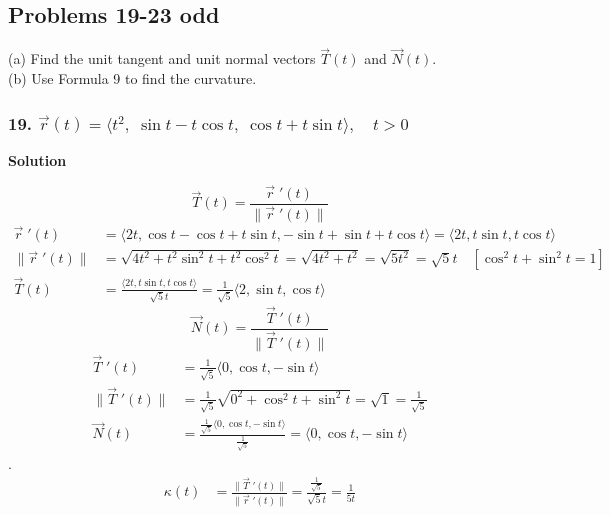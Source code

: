 \documentclass{article}
\newcommand{\drvec}{\vec{r}\;'(t)}
\begin{document}
\subsection*{Problems 19-23 odd}

(a) Find the unit tangent and unit normal vectors $\vec{T}(t)$ and $\vec{N}(t)$. \\
(b) Use Formula 9 to find the curvature.

\subsubsection*{19. $\vec{r}(t) = \langle{t^2,\; \sin{t} - t\cos{t},\; \cos{t} + t\sin{t}} \rangle, \quad t > 0$}
\centerline{\textbf{Solution}}
\[
    \vec{T}(t) = \frac{\drvec}{\|\drvec\|}   
\]
\begin{align*}
    \drvec &= \langle 2t, \cos t - \cos t + t\sin t, -\sin t + \sin t + t\cos t \rangle = \langle 2t, t\sin t, t\cos t \rangle \\
    \|\drvec\| &= \sqrt{4t^2 + t^2\sin^2t + t^2\cos^2t} = \sqrt{4t^2 + t^2} = \sqrt{5t^2} = \sqrt{5}t \quad [\cos^2t + \sin^2t = 1] \\ 
    \vec{T}(t) &= \frac{\langle 2t, t\sin t, t\cos t \rangle}{\sqrt{5}t} = \frac{1}{\sqrt{5}}\langle 2, \sin t, \cos t \rangle
\end{align*}
\[
    \vec{N}(t) = \frac{\vec{T}\;'(t)}{\|\vec{T}\;'(t)\|}
\]
\begin{align*}
    \vec{T}\;'(t) &= \frac{1}{\sqrt{5}}\langle 0, \cos t, -\sin t \rangle \\
    \|\vec{T}\;'(t)\| &= \frac {1}{\sqrt 5} \sqrt{0^2 + \cos^2t + \sin^2t} = \sqrt{1} = \frac{1}{\sqrt 5} \\
    \vec{N}(t) &= \frac{ \frac{1}{\sqrt{5}} \langle 0, \cos t, -\sin t \rangle}{\frac{1}{\sqrt{5}}} = \langle 0, \cos t, -\sin t \rangle 
\end{align*}
. 
\begin{align*}
    \kappa(t) &= \frac{\|\vec{T}\;'(t)\|}{\|\drvec\|} = \frac{\frac{1}{\sqrt 5}}{\sqrt 5t} = \frac{1}{5t}
\end{align*}
\end{document}
